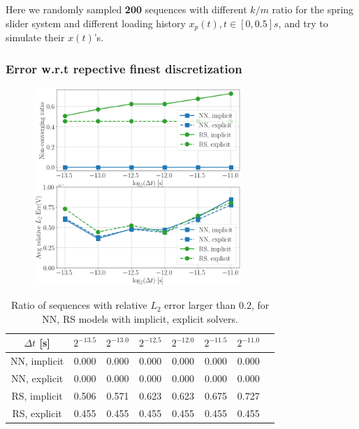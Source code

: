 Here we randomly sampled \textbf{200} sequences with different $k/m$ ratio for the spring slider system and different loading history $x_p(t), t \in [0, 0.5] s$, 
and try to simulate their $x(t)$'s. 
\subsubsection{Error w.r.t repective finest discretization}
\begin{figure}[H]
    \centering
    \includegraphics[width=0.7\textwidth]{images/err_timesteps_rs_nn_0531_respective.png}
\end{figure}
\begin{table}[H]
    \centering
    \begin{tabular}{cccccccc}
        \hline
        $\Delta t$ [s] & $2^{-13.5}$ & $2^{-13.0}$ & $2^{-12.5}$ & $2^{-12.0}$ & $2^{-11.5}$ & $2^{-11.0}$ \\
        \hline
        NN, implicit & 0.000 & 0.000 & 0.000 & 0.000 & 0.000 & 0.000 \\
        NN, explicit & 0.000 & 0.000 & 0.000 & 0.000 & 0.000 & 0.000 \\
        RS, implicit & 0.506 & 0.571 & 0.623 & 0.623 & 0.675 & 0.727 \\
        RS, explicit & 0.455 & 0.455 & 0.455 & 0.455 & 0.455 & 0.455 \\
        \hline
    \end{tabular}
    \caption{Ratio of sequences with relative $L_2$ error larger than $0.2$,  
    for NN, RS models with implicit, explicit solvers.}
    \label{tab:NaNRatioSpringSliderRsVsNNRespective}
\end{table}

